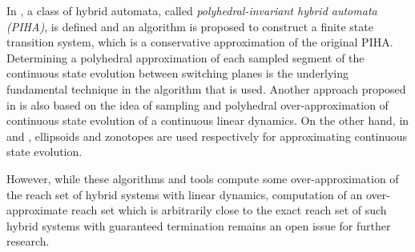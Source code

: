 In \cite{chutinan:03}, a class of hybrid automata, called {\em polyhedral-invariant hybrid automata (PIHA)}, is defined and an algorithm is proposed to construct a finite state transition system, which is a conservative approximation of the original PIHA. 
Determining a polyhedral approximation of each sampled segment of the continuous state evolution between switching planes is the underlying fundamental technique in the algorithm that is used.
Another approach proposed in \cite{asarin:00} is also based on the idea of sampling and polyhedral over-approximation of continuous state evolution of a continuous linear dynamics. 
On the other hand, in \cite{kurzh:00} and \cite{girard:05}, ellipsoids and zonotopes are used respectively for approximating continuous state evolution.

However, while these algorithms and tools compute some over-approximation of the reach set of hybrid systems with linear dynamics, computation of an over-approximate reach set which is arbitrarily close to the exact reach set of such hybrid systems with guaranteed termination remains an open issue for further research. 



